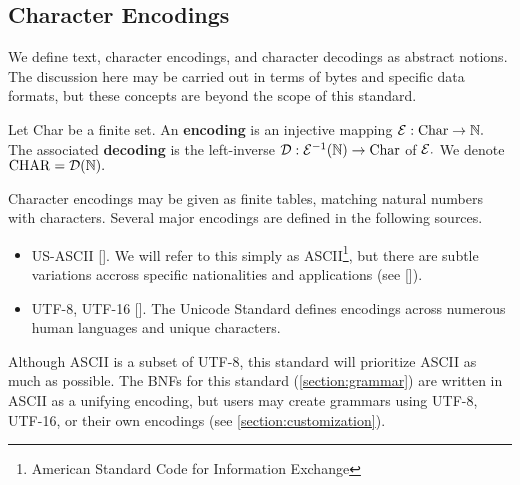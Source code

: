 \subsection{Character Encodings}
We define text, character encodings, and character decodings as abstract notions. The discussion here may be carried out in terms of bytes and specific data formats, but these concepts are beyond the scope of this standard.

Let Char be a finite set. An \textbf{encoding} is an injective mapping $\mathcal{E} : \mathrm{Char} \to \mathbb{N}.$ The associated \textbf{decoding} is the left-inverse $\mathcal{D}: \mathcal{E}^{-1}(\mathbb{N}) \to \mathrm{Char}$ of $\mathcal{E}.$ We denote $\mathrm{CHAR} = \mathcal{D}(\mathbb{N}).$

Character encodings may be given as finite tables, matching natural numbers with characters. Several major encodings are defined in the following sources.
\begin{itemize}
	\item US-ASCII []. We will refer to this simply as ASCII\footnote{American Standard Code for Information Exchange}, but there are subtle variations accross specific nationalities and applications (see []).
	\item UTF-8, UTF-16 []. The Unicode Standard defines encodings across numerous human languages and unique characters.  %
\end{itemize}


Although ASCII is a subset of UTF-8, this standard will prioritize ASCII as much as possible. The BNFs for this standard (\ref{section:grammar}) are written in ASCII as a unifying encoding, but users may create grammars using UTF-8, UTF-16, or their own encodings (see \ref{section:customization}).


